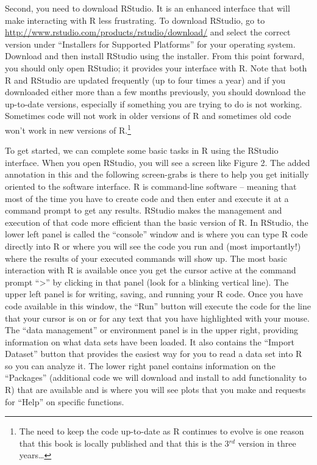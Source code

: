 \documentclass[]{article}
\let\rmarkdownfootnote\footnote%
\def\footnote{\protect\rmarkdownfootnote}
\begin{document}
Second, you need to download RStudio. It is an enhanced interface that
will make interacting with R less frustrating. To download RStudio, go
to \url{http://www.rstudio.com/products/rstudio/download/} and select
the correct version under ``Installers for Supported Platforms'' for
your operating system. Download and then install RStudio using the
installer. From this point forward, you should only open RStudio; it
provides your interface with R. Note that both R and RStudio are updated
frequently (up to four times a year) and if you downloaded either more
than a few months previously, you should download the up-to-date
versions, especially if something you are trying to do is not working.
Sometimes code will not work in older versions of R and sometimes old
code won't work in new versions of R.\footnote{The need to keep the code
  up-to-date as R continues to evolve is one reason that this book is
  locally published and that this is the 3\(^{rd}\) version in three
  years\ldots{}}

To get started, we can complete some basic tasks in R using the RStudio
interface. When you open RStudio, you will see a screen like Figure 2.
The added annotation in this and the following screen-grabs is there to
help you get initially oriented to the software interface. R is
command-line software -- meaning that most of the time you have to
create code and then enter and execute it at a command prompt to get any
results. RStudio makes the management and execution of that code more
efficient than the basic version of R. In RStudio, the lower left panel
is called the ``console'' window and is where you can type R code
directly into R or where you will see the code you run and (most
importantly!) where the results of your executed commands will show up.
The most basic interaction with R is available once you get the cursor
active at the command prompt ``\textgreater{}'' by clicking in that
panel (look for a blinking vertical line). The upper left panel is for
writing, saving, and running your R code. Once you have code available
in this window, the ``Run'' button will execute the code for the line
that your cursor is on or for any text that you have highlighted with
your mouse. The ``data management'' or environment panel is in the upper
right, providing information on what data sets have been loaded. It also
contains the ``Import Dataset'' button that provides the easiest way for
you to read a data set into R so you can analyze it. The lower right
panel contains information on the ``Packages'' (additional code we will
download and install to add functionality to R) that are available and
is where you will see plots that you make and requests for ``Help'' on
specific functions.
\end{document}
